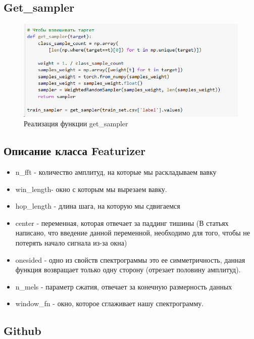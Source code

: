 \documentclass[a4paper,12pt]{article}
\begin{document}
 	\subsection{Get\_sampler}\label{getsampler}
 	\begin{figure}[H]
 		\centering
 		\includegraphics[width=0.7\linewidth]{Image/Get_sampler}
 		\caption{Реализация функции get\_sampler}
 		\label{fig:getsampler}
 	\end{figure}
 	
 	
 	\subsection{Описание класса Featurizer}\label{Featurizer}
 		\begin{itemize}
 		\item n\_fft - количество амплитуд, на которые мы раскладываем вавку
 		\item win\_length- окно с которым мы вырезаем вавку.
 		\item hop\_length - длина шага, на которую мы сдвигаемся
 		\item center - переменная, которая отвечает за паддинг тишины (В статьях написано, что введение данной переменной, необходимо для того, чтобы не потерять начало сигнала из-за окна)
 		\item onesided - одно из свойств спектрограммы это ее симметричность, данная функция возвращает только одну сторону (отрезает половину амплитуд).
 		\item n\_mels - параметр сжатия, отвечает за конечную размерность данных
 		\item window\_fn - окно, которое сглаживает нашу спектрограмму. 
 	\end{itemize}
 
 	\subsection{Github}
 	
\end{document}

